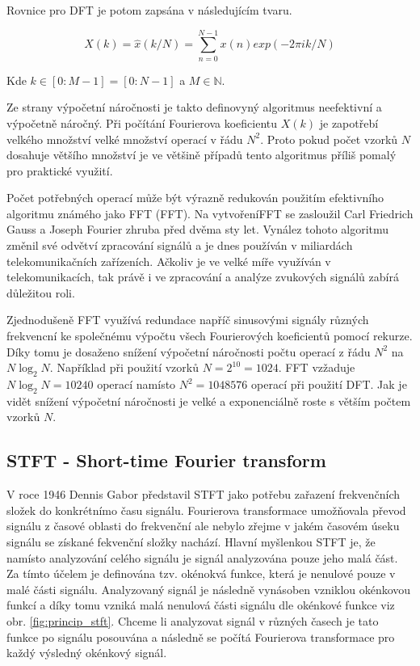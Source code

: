   Rovnice pro \acs{DFT} je potom zapsána v následujícím tvaru. 

  \begin{equation}
    X(k) = \hat{x}(k/N) = \sum_{n = 0}^{N - 1} x(n) exp(-2 \pi i k/N)
    \label{rov:DFT}
  \end{equation}

  Kde $ k \in [0:M - 1] = [0:N - 1] $ a $ M \in \mathbb{N}$.

  Ze strany výpočetní náročnosti je takto definovyný algoritmus neefektivní a výpočetně náročný.
  Při počítání Fourierova koeficientu $X(k)$ je zapotřebí velkého množství velké množství operací v řádu $N^2$.
  Proto pokud počet vzorků $N$ dosahuje většího množství je ve většině případů tento algoritmus příliš pomalý pro praktické využití.

  Počet potřebných operací může být výrazně redukován použitím efektivního algoritmu známého jako \acs{FFT} (\acl{FFT}).
  Na vytvoření\acs{FFT} se zasloužil Carl Friedrich Gauss a Joseph Fourier zhruba před dvěma sty let.
  Vynález tohoto algoritmu změnil své odvětví zpracování signálů a je dnes používán v miliardách telekomunikačních zařízeních.
  Ačkoliv je ve velké míře využíván v telekomunikacích, tak právě i ve zpracování a analýze zvukových signálů zabírá důležitou roli.

  Zjednodušeně \acs{FFT} využívá redundace napříč sinusovými signály různých frekvencní ke společnému výpočtu všech Fourierových koeficientů pomocí rekurze.
  Díky tomu je dosaženo snížení výpočetní náročnosti počtu operací z řádu $N^2$ na $N\log_2 N$.
  Například při použití vzorků $N = 2^10 = 1024$. \acs{FFT} vzžaduje $N\log_2N = 10240 $ operací namísto
  $N^2 = 1048576$ operací při použití \acs{DFT}. Jak je vidět snížení výpočetní náročnosti je velké a exponenciálně roste s větším počtem vzorků $N$.
  
  \subsection{STFT - Short-time Fourier transform} \label{sec:STFT}

  V roce 1946 Dennis Gabor představil \acs{STFT} jako potřebu zařazení frekvenčních složek do konkrétnímo času signálu.
  Fourierova transformace umožňovala převod signálu z časové oblasti do frekvenční ale nebylo zřejme v jakém časovém úseku signálu se získané fekvenční složky nachází.
  Hlavní myšlenkou \acs{STFT} je, že namísto analyzování celého signálu je signál analyzována pouze jeho malá část.
  Za tímto účelem je definována tzv. okénokvá funkce, která je nenulové pouze v malé části signálu.
  Analyzovaný signál je následně vynásoben vzniklou okénkovou funkcí a díky tomu vzniká malá nenulová části signálu dle okénkové funkce viz obr. \ref{fig:princip_stft}.
  Chceme li analyzovat signál v různých časech je tato funkce po signálu posouvána a následně se počítá Fourierova transformace pro každý výsledný okénkový signál.

